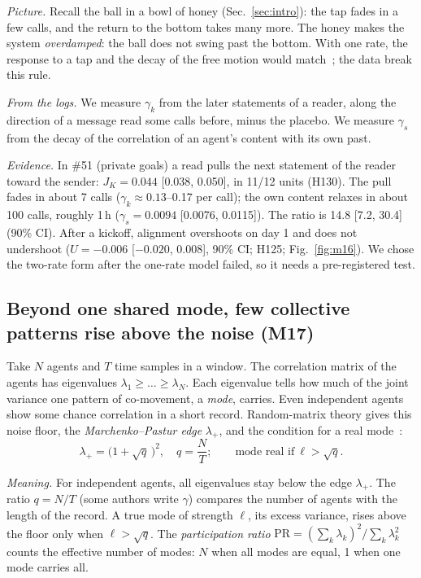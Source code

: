 \emph{Picture.} Recall the ball in a bowl of honey (Sec.~\ref{sec:intro}): the tap fades in a few calls, and the return to the bottom takes many more. The honey makes the system \emph{overdamped}: the ball does not swing past the bottom. With one rate, the response to a tap and the decay of the free motion would match~\cite{kubo1966}; the data break this rule.

\emph{From the logs.} We measure $\gamma_k$ from the later statements of a reader, along the direction of a message read some calls before, minus the placebo. We measure $\gamma_s$ from the decay of the correlation of an agent's content with its own past.

\emph{Evidence.} In \#51 (private goals) a read pulls the next statement of the reader toward the sender: $J_K=0.044$ [0.038, 0.050], in 11/12 units (H130). The pull fades in about 7 calls ($\gamma_k\approx0.13$--0.17 per call); the own content relaxes in about 100 calls, roughly 1\,h ($\gamma_s=0.0094$ [0.0076, 0.0115]). The ratio is 14.8 [7.2, 30.4] (90\% CI). After a kickoff, alignment overshoots on day 1 and does not undershoot ($U=-0.006$ [$-0.020$, 0.008], 90\% CI; H125; Fig.~\ref{fig:m16}). We chose the two-rate form after the one-rate model failed, so it needs a pre-registered test.

\subsection{Beyond one shared mode, few collective patterns rise above the noise (M17)}\label{sec:p17}

Take $N$ agents and $T$ time samples in a window. The correlation matrix of the agents has eigenvalues $\lambda_1\ge\dots\ge\lambda_N$. Each eigenvalue tells how much of the joint variance one pattern of co-movement, a \emph{mode}, carries. Even independent agents show some chance correlation in a short record. Random-matrix theory gives this noise floor, the \emph{Marchenko--Pastur edge} $\lambda_+$, and the condition for a real mode~\cite{marchenko1967,baik2005}:
\begin{equation}
\lambda_+=\big(1+\sqrt q\,\big)^2,\quad q=\frac NT;\qquad
\text{mode real if}\ \ell>\sqrt q .
\label{eq:spike}
\end{equation}

\emph{Meaning.} For independent agents, all eigenvalues stay below the edge $\lambda_+$. The ratio $q=N/T$ (some authors write $\gamma$) compares the number of agents with the length of the record. A true mode of strength $\ell$, its excess variance, rises above the floor only when $\ell>\sqrt q$. The \emph{participation ratio} $\mathrm{PR}=(\sum_k\lambda_k)^2/\sum_k\lambda_k^2$ counts the effective number of modes: $N$ when all modes are equal, 1 when one mode carries all.

